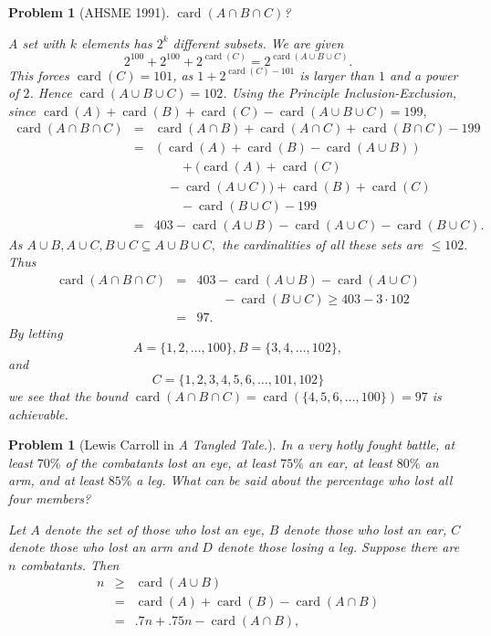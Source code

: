 \documentclass[11pt, openany]{book}
\theoremstyle{change} \theoremheaderfont{\blue\sffamily\bfseries}
\newtheorem{pro}[thm]{Problem}
\theoremstyle{nonumberplain} \theoremheaderfont{\sffamily\bfseries}
\newcommand{\í}{\'{\i}}
\def\card#1{\operatorname{card}\left(#1\right)}
\begin{document}
\begin{multicols}{2}
\begin{pro}[AHSME 1991]
$\card{A\cap B\cap C}$? \begin{answer} A set with $k$ elements has
$2^k$ different subsets. We are given
$$ 2^{100} + 2^{100} + 2^{\card{C}} = 2^{\card{A\cup B\cup C}}.$$ This forces
$\card{C} = 101$, as $1 + 2^{\card{C} - 101}$ is larger than $1$ and
a power of $2$. Hence $\card{A\cup B \cup C} = 102$. Using the
Principle Inclusion-Exclusion, since $\card{A} + \card{B} + \card{C}
- \card{A \cup B \cup C} = 199,$
$$ \begin{array}{lcl}\card{A\cap B \cap C} & = & \card{A\cap B} + \card{A\cap C} + \card{B \cap
C} - 199 \\
& = & (\card{A} + \card{B} - \card{A\cup B}) \\ & & \qquad + (\card{A} + \card{C} \\
& & \quad - \card{A\cup C}) + \card{B} + \card{C}\\ & & \qquad  - \card{B\cup C} - 199 \\
& = & 403 - \card{A\cup B} - \card{A \cup C} - \card{B\cup
C}.\end{array}$$As $A\cup B, A\cup C, B\cup C \subseteq A\cup B \cup
C,$ the cardinalities of all these sets are $\leq 102.$ Thus
$$\begin{array}{lll} \card{A\cap B \cap C} & = & 403 - \card{A\cup B} - \card{A\cup C}\\ & & \qquad  - \card{B \cup C} \geq 403 -
3\cdot 102\\ &  = &  97. \end{array}$$ By letting $$A = \{ 1, 2,
\ldots , 100\} , B = \{ 3, 4, \ldots , 102\} ,$$ and $$C = \{ 1, 2,
3, 4, 5, 6, \ldots, 101, 102\}$$ we see that the bound $\card{A\cap
B \cap C} = \card{\{ 4, 5, 6, \ldots , 100\}} = 97$ is achievable.
\end{answer}
\end{pro}
\begin{pro}[Lewis Carroll in {\em A Tangled Tale.}]
In a very hotly fought battle, at least $70\%$ of the combatants
lost an eye, at least $75\%$ an ear, at least $80\%$ an arm, and at
least $85\%$ a leg. What can be said about the percentage who lost
all four members? \begin{answer} Let $A$ denote the set of those who
lost an eye, $B$ denote those who lost an ear, $C$ denote those who
lost an arm and $D$ denote those losing a leg. Suppose there are $n$
combatants.
 Then
$$\begin{array}{lll}n & \geq & \card{ A \cup B} \\ & = &  \card{ A} + \card{ B} - \card{ A \cap B} \\ & = & .7n + .75n - \card{ A\cap B}, \end{array}$$

\end{answer}
\end{pro}
\end{multicols}
\end{document}
